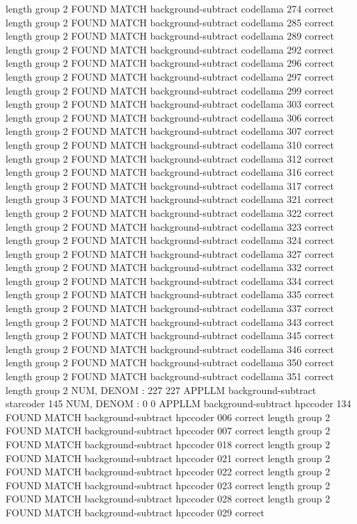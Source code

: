 length group  2
FOUND MATCH background-subtract codellama 274 correct
length group  2
FOUND MATCH background-subtract codellama 285 correct
length group  2
FOUND MATCH background-subtract codellama 289 correct
length group  2
FOUND MATCH background-subtract codellama 292 correct
length group  2
FOUND MATCH background-subtract codellama 296 correct
length group  2
FOUND MATCH background-subtract codellama 297 correct
length group  2
FOUND MATCH background-subtract codellama 299 correct
length group  2
FOUND MATCH background-subtract codellama 303 correct
length group  2
FOUND MATCH background-subtract codellama 306 correct
length group  2
FOUND MATCH background-subtract codellama 307 correct
length group  2
FOUND MATCH background-subtract codellama 310 correct
length group  2
FOUND MATCH background-subtract codellama 312 correct
length group  2
FOUND MATCH background-subtract codellama 316 correct
length group  2
FOUND MATCH background-subtract codellama 317 correct
length group  3
FOUND MATCH background-subtract codellama 321 correct
length group  2
FOUND MATCH background-subtract codellama 322 correct
length group  2
FOUND MATCH background-subtract codellama 323 correct
length group  2
FOUND MATCH background-subtract codellama 324 correct
length group  2
FOUND MATCH background-subtract codellama 327 correct
length group  2
FOUND MATCH background-subtract codellama 332 correct
length group  2
FOUND MATCH background-subtract codellama 334 correct
length group  2
FOUND MATCH background-subtract codellama 335 correct
length group  2
FOUND MATCH background-subtract codellama 337 correct
length group  2
FOUND MATCH background-subtract codellama 343 correct
length group  2
FOUND MATCH background-subtract codellama 345 correct
length group  2
FOUND MATCH background-subtract codellama 346 correct
length group  2
FOUND MATCH background-subtract codellama 350 correct
length group  2
FOUND MATCH background-subtract codellama 351 correct
length group  2
NUM, DENOM : 227 227
APPLLM background-subtract starcoder
145
NUM, DENOM : 0 0
APPLLM background-subtract hpccoder
134
FOUND MATCH background-subtract hpccoder 006 correct
length group  2
FOUND MATCH background-subtract hpccoder 007 correct
length group  2
FOUND MATCH background-subtract hpccoder 018 correct
length group  2
FOUND MATCH background-subtract hpccoder 021 correct
length group  2
FOUND MATCH background-subtract hpccoder 022 correct
length group  2
FOUND MATCH background-subtract hpccoder 023 correct
length group  2
FOUND MATCH background-subtract hpccoder 028 correct
length group  2
FOUND MATCH background-subtract hpccoder 029 correct
